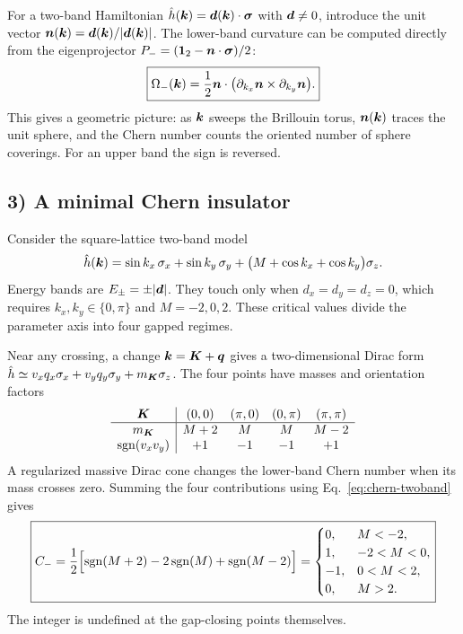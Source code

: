 For a two-band Hamiltonian $\hat{h}(\bm{k})=\bm{d}(\bm{k})\cdot\bm{\sigma}$ with $\bm{d}\ne0$, introduce the unit vector $\bm{n}(\bm{k})=\bm{d}(\bm{k})/|\bm{d}(\bm{k})|$. The lower-band curvature can be computed directly from the eigenprojector $P_-=(\mathbf1_2-\bm{n}\cdot\bm{\sigma})/2$:
\begin{equation}\label{eq:chern-twoband}
\boxed{\Omega_-(\bm{k})=\frac12\bm{n}\cdot
\bigl(\partial_{k_x}\bm{n}\times\partial_{k_y}\bm{n}\bigr).}
\end{equation}
This gives a geometric picture: as $\bm{k}$ sweeps the Brillouin torus, $\bm{n}(\bm{k})$ traces the unit sphere, and the Chern number counts the oriented number of sphere coverings. For an upper band the sign is reversed.

\subsection*{3) A minimal Chern insulator}
Consider the square-lattice two-band model
\begin{equation}\label{eq:q-w-z}
\hat{h}(\bm{k})=\sin k_x\,\sigma_x+\sin k_y\,\sigma_y+
\bigl(M+\cos k_x+\cos k_y\bigr)\sigma_z.
\end{equation}
Energy bands are $E_\pm=\pm|\bm{d}|$. They touch only when $d_x=d_y=d_z=0$, which requires $k_x,k_y\in\{0,\pi\}$ and $M=-2,0,2$. These critical values divide the parameter axis into four gapped regimes.

Near any crossing, a change $\bm{k}=\bm{K}+\bm{q}$ gives a two-dimensional Dirac form $\hat{h}\simeq v_xq_x\sigma_x+v_yq_y\sigma_y+m_{\bm{K}}\sigma_z$. The four points have masses and orientation factors
\begin{equation}
\begin{array}{c|cccc}
\bm{K} &(0,0)&(\pi,0)&(0,\pi)&(\pi,\pi)\\\hline
m_{\bm{K}}&M+2&M&M&M-2\\
\operatorname{sgn}(v_xv_y)&+1&-1&-1&+1
\end{array}
\end{equation}
A regularized massive Dirac cone changes the lower-band Chern number when its mass crosses zero. Summing the four contributions using Eq.~\eqref{eq:chern-twoband} gives
\begin{equation}\label{eq:q-w-z-phase}
\boxed{C_- =\frac12\Bigl[\operatorname{sgn}(M+2)-2\operatorname{sgn}(M)
+\operatorname{sgn}(M-2)\Bigr]
=\begin{cases}
0,&M<-2,\\
1,&-2<M<0,\\
-1,&0<M<2,\\
0,&M>2.
\end{cases}}
\end{equation}
The integer is undefined at the gap-closing points themselves.

